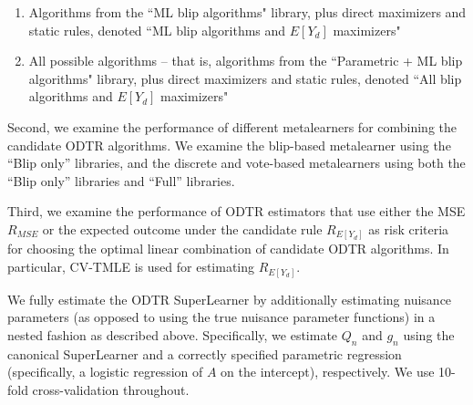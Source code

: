 \documentclass[a4paper,12pt]{article}
\begin{document}
\begin{enumerate}
    \item[(d)] Algorithms from the ``ML blip algorithms" library, plus direct maximizers and static rules, denoted ``ML blip algorithms and $E[Y_d]$ maximizers"
    \item[(e)] All possible algorithms -- that is, algorithms from the ``Parametric + ML blip algorithms" library, plus direct maximizers and static rules, denoted ``All blip algorithms and $E[Y_d]$ maximizers"
\end{enumerate}

Second, we examine the performance of different metalearners for combining the candidate ODTR algorithms. We examine the blip-based metalearner using the ``Blip only” libraries, and the discrete and vote-based metalearners using both the ``Blip only” libraries and ``Full” libraries. 

Third, we examine the performance of ODTR estimators that use either the MSE $R_{MSE}$ or the expected outcome under the candidate rule $R_{E[Y_d]}$ as risk criteria for choosing the optimal linear combination of candidate ODTR algorithms. In particular, CV-TMLE is used for estimating $R_{E[Y_d]}$.


We fully estimate the ODTR SuperLearner by additionally estimating nuisance parameters (as opposed to using the true nuisance parameter functions) in a nested fashion \citep{coyle2017computational} as described above. Specifically, we estimate $Q_n$ and $g_n$ using the canonical SuperLearner \citep{polley2010super, SLpackage} and a correctly specified parametric regression (specifically, a logistic regression of $A$ on the intercept), respectively. We use 10-fold cross-validation throughout.
\end{document}
